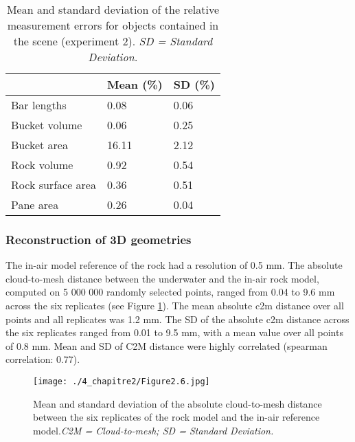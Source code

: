 \begin{table}[htbp]
  \centering
  \normalsize
  \caption[Mean and standard deviation of the relative measurement errors for objects contained in the scene]{Mean and standard deviation of the relative measurement errors for objects contained in the scene (experiment 2). \textit{SD = Standard Deviation.}}
  \label{table2.6}
  
\begin{tabular}{L{4cm} C{2cm}C{2cm}}
        \toprule
                          & \textbf{Mean (\%)} & \textbf{SD (\%)} \\ \midrule
        Bar lengths       & 0.08               & 0.06             \\
        Bucket volume     & 0.06               & 0.25             \\
        Bucket area       & 16.11              & 2.12             \\
        Rock volume       & 0.92               & 0.54             \\
        Rock surface area & 0.36               & 0.51             \\
        Pane area         & 0.26               & 0.04             \\ \bottomrule
    \end{tabular}
\end{table}

\subsubsection{Reconstruction of 3D geometries}\label{chapitre2_3.2.3}
The in-air model reference of the rock had a resolution of 0.5 mm. The absolute cloud-to-mesh distance between the underwater and the in-air rock model, computed on 5 000 000 randomly selected points, ranged from 0.04 to 9.6 mm across the six replicates (see Figure \ref{figure2.6}). The mean absolute \acrshort{c2m} distance over all points and all replicates was 1.2 mm. The SD of the absolute \acrshort{c2m} distance across the six replicates ranged from 0.01 to 9.5 mm, with a mean value over all points of 0.8 mm. Mean and SD of C2M distance were highly correlated (spearman correlation: 0.77).

\begin{figure}[htbp]
	\texttt{[image: ./4\_chapitre2/Figure2.6.jpg]}
	\caption[Mean and standard deviation of the absolute cloud-to-mesh distance between the six replicates of the rock model and the in-air reference model.]{Mean and standard deviation of the absolute cloud-to-mesh distance between the six replicates of the rock model and the in-air reference model.\textit{C2M = Cloud-to-mesh; SD = Standard Deviation.}}
	\label{figure2.6}
\end{figure}


